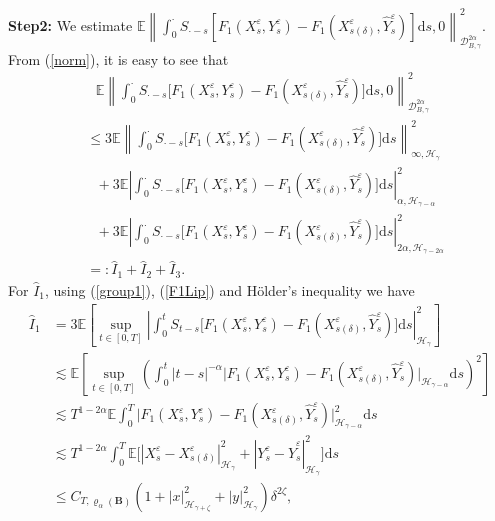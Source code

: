 \documentclass[10pt,a4paper]{article}
\numberwithin{equation}{section}
\begin{document}
\textbf{Step2:} We estimate $\mathbb E \left\| \int_0^\cdot S_{\cdot-s} [F_1(X_s^\varepsilon,Y_s^\varepsilon)
-F_1(X_{s(\delta)}^\varepsilon,\hat{Y}_s^\varepsilon) ]\mathrm{d} s,0 \right\|_{\mathcal{D}_{B,\gamma}^{2\alpha}}^2$.
From (\ref{norm}), it is easy to see that
\begin{align}\label{F1dif}
&~~~ \mathbb E \left\| \displaystyle\int_0^\cdot S_{\cdot-s} \big[F_1(X_s^\varepsilon,Y_s^\varepsilon)
-F_1(X_{s(\delta)}^\varepsilon,\hat{Y}_s^\varepsilon) \big]\mathrm{d} s,0 \right\|_{\mathcal{D}_{B,\gamma}^{2\alpha}}^2 \nonumber\\	
&\leq  3 \mathbb E \left\| \displaystyle\int_0^\cdot S_{\cdot-s} \big[F_1(X_s^\varepsilon,Y_s^\varepsilon)
-F_1(X_{s(\delta)}^\varepsilon,\hat{Y}_s^\varepsilon) \big]\mathrm{d} s \right\|_{\infty,\mathcal H_\gamma}^2 \nonumber\\	
&~~~+ 3 \mathbb E \left| \displaystyle\int_0^\cdot S_{\cdot-s} \big[F_1(X_s^\varepsilon,Y_s^\varepsilon)
-F_1(X_{s(\delta)}^\varepsilon,\hat{Y}_s^\varepsilon) \big]\mathrm{d} s \right|_{\alpha,\mathcal H_{\gamma-\alpha}}^2 \nonumber\\
&~~~+3  \mathbb E \left| \displaystyle\int_0^\cdot S_{\cdot-s} \big[F_1(X_s^\varepsilon,Y_s^\varepsilon)
-F_1(X_{s(\delta)}^\varepsilon,\hat{Y}_s^\varepsilon) \big]\mathrm{d} s \right|_{2\alpha,\mathcal H_{\gamma-2\alpha}}^2 \nonumber\\
& =:\hat{I}_1+\hat{I}_2+\hat{I}_3.	
\end{align}
For $\hat{I}_1$, using (\ref{group1}), (\ref{F1Lip}) and H\"{o}lder's inequality we have
\begin{align}\label{K_1eta}
\hat{I}_1 & = 3\mathbb E \left [ \sup_{t \in [0,T]}
	\left| \int_0^t S_{t-s} \big[F_1(X_s^\varepsilon,Y_s^\varepsilon)-F_1(X_{s(\delta)}^\varepsilon,\hat{Y}_s^\varepsilon) \big]\mathrm{d} s \right|_{\mathcal H_\gamma }^2\right ] \nonumber\\
	& \lesssim  \mathbb E \left [ \sup_{t\in [0,T]} \left( \int_0^t |t-s|^{-\alpha}   \big| F_1(X_s^\varepsilon,Y_s^\varepsilon)-F_1(X_{s(\delta)}^\varepsilon,\hat{Y}_s^\varepsilon) \big|_{\mathcal H_{\gamma-\alpha} } \mathrm{d} s \right)^2\right ] \nonumber\\
	&\lesssim T^{1-2\alpha} \mathbb E\int_0^T \big| F_1(X_s^\varepsilon,Y_s^\varepsilon)-F_1(X_{s(\delta)}^\varepsilon,\hat{Y}_s^\varepsilon) \big|_{\mathcal H_{\gamma-\alpha} }^2 \mathrm{d} s \nonumber\\
	&\lesssim  T^{1-2\alpha}  \int_0^T  \mathbb E \big[| X_s^\varepsilon
	-X_{s(\delta)}^\varepsilon |_{\mathcal H_\gamma }^2+|Y_s^\varepsilon-\hat{Y}_s^\varepsilon|_{\mathcal H_\gamma }^2 \big] \mathrm{d} s \nonumber\\
	&\leq  C_{T,\varrho_{\alpha}(\mathbf{B})} (1+|x|_{\mathcal{H}_{\gamma+\zeta}}^2+|y|_{\mathcal{H}_\gamma}^2)\delta^{2\zeta},
\end{align}
\end{document}
